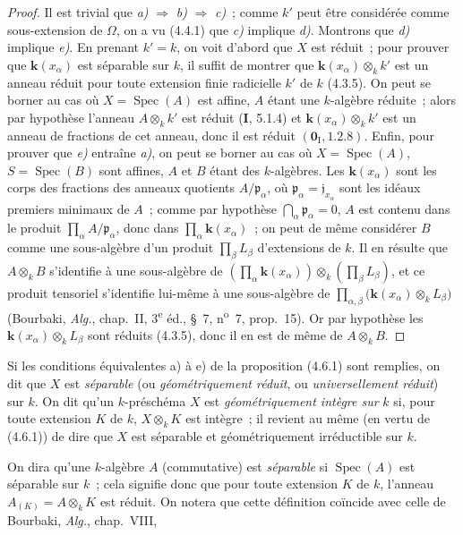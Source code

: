 \begin{proof}
Il est trivial que \emph{a)} $\Rightarrow$ \emph{b)} $\Rightarrow$ \emph{c)}~; comme $k'$ peut être
considérée comme sous-extension de $\Omega$, on a vu (4.4.1) que \emph{c)} implique
\emph{d)}. Montrons que \emph{d)} implique \emph{e)}. En prenant $k'=k$, on voit d'abord que $X$
est réduit~; pour prouver que $\boldsymbol{k}(x_\alpha)$ est séparable sur $k$, il suffit de
montrer que $\boldsymbol{k}(x_\alpha)\otimes_k k'$ est un anneau réduit pour toute extension
finie radicielle $k'$ de $k$ (4.3.5). On peut se borner au cas où
$X=\operatorname{Spec}(A)$ est affine, $A$ étant une $k$-algèbre réduite~; alors
par hypothèse l'anneau $A\otimes_k k'$ est réduit (\textbf{I}, 5.1.4) et
$\boldsymbol{k}(x_\alpha)\otimes_k k'$ est un anneau de fractions de cet anneau, donc il est
réduit $(\mathbf{0}_{\mathrm I},1.2.8)$. Enfin, pour prouver que \emph{e)} entraîne \emph{a)}, on peut
se borner au cas où $X=\operatorname{Spec}(A)$, $S=\operatorname{Spec}(B)$ sont
affines, $A$ et $B$ étant des $k$-algèbres. Les $\boldsymbol{k}(x_\alpha)$ sont les corps des
fractions des anneaux quotients $A/\mathfrak p_\alpha$, où
$\mathfrak p_\alpha=\mathfrak j_{x_\alpha}$ sont les idéaux premiers minimaux de
$A$~; comme par hypothèse $\bigcap_\alpha\mathfrak p_\alpha=0$, $A$ est contenu
dans le produit $\prod_\alpha A/\mathfrak p_\alpha$, donc dans
$\prod_\alpha \boldsymbol{k}(x_\alpha)$~; on peut de même considérer $B$ comme une
sous-algèbre d'un produit $\prod_\beta L_\beta$ d'extensions de $k$. Il en
résulte que $A\otimes_k B$ s'identifie à une sous-algèbre de
$\left(\prod_\alpha \boldsymbol{k}(x_\alpha)\right)\otimes_k
\left(\prod_\beta L_\beta\right)$,
et ce produit tensoriel s'identifie lui-même à une sous-algèbre de
$\prod_{\alpha,\beta}\bigl(\boldsymbol{k}(x_\alpha)\otimes_k L_\beta\bigr)$
(Bourbaki, \emph{Alg.}, chap.~II, 3\textsuperscript{e} éd., \S~7,
n\textsuperscript{o}~7, prop.~15). Or par hypothèse les
$\boldsymbol{k}(x_\alpha)\otimes_k L_\beta$ sont réduits (4.3.5), donc il en est de même de
$A\otimes_k B$.
\end{proof}

\begin{definition}[4.6.2]
\label{IV.2.4.6.2-fr}
Si les conditions équivalentes \textup{a)} à \textup{e)} de la proposition \textup{(4.6.1)} sont
remplies, on dit que $X$ est \emph{séparable} (ou \emph{géométriquement réduit},
ou \emph{universellement réduit}) \textup{sur} $k$. On dit qu'un $k$-préschéma $X$ est
\emph{géométriquement intègre sur} $k$ si, pour toute extension $K$ de $k$,
$X\otimes_k K$ est intègre~; il revient au même (en vertu de \textup{(4.6.1)}) de dire
que $X$ est séparable et géométriquement irréductible sur $k$.
\end{definition}

On dira qu'une $k$-algèbre $A$ (commutative) est \emph{séparable} si
$\operatorname{Spec}(A)$ est séparable sur $k$~; cela signifie donc que pour
toute extension $K$ de $k$, l'anneau $A_{(K)}=A\otimes_k K$ est réduit. On
notera que cette définition coïncide avec celle de Bourbaki, \emph{Alg.},
chap.~VIII,
